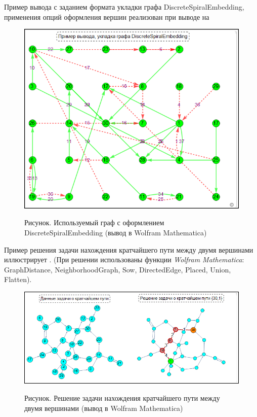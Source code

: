 Пример вывода с заданием формата укладки графа DiscreteSpiralEmbedding, применения опций оформления вершин реализован при выводе на \textit{} 

\begin{figure}[H]
	\caption{Рисунок. Используемый граф с оформлением DiscreteSpiralEmbedding (вывод в Wolfram Mathematica)}
	\includegraphics[scale=0.87]{images/part7/chapter_integration/integr_alg34.png}
	\label{fig:integr_alg34}
\end{figure}

Пример решения задачи нахождения кратчайшего пути между двумя вершинами иллюстрирует \textit{}. (При решении использованы функции \textit{Wolfram Mathematica}: GraphDistance, NeighborhoodGraph, Sow, DirectedEdge, Placed, Union, Flatten).

\begin{figure}[H]
	\caption{Рисунок. Решение задачи нахождения кратчайшего пути между двумя вершинами (вывод в Wolfram Mathematica)}
	\includegraphics[scale=0.55]{images/part7/chapter_integration/integr_alg35.png}
	\label{fig:integr_alg35}
\end{figure}


